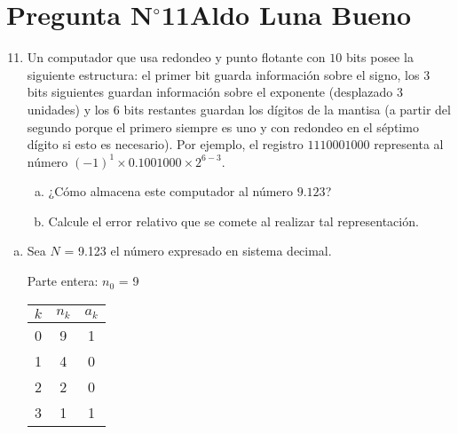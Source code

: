 \section{Pregunta N$^{\circ}$11\qquad Aldo Luna Bueno}

\begin{frame}
	\begin{enumerate}\setcounter{enumi}{10}
		\item

		      Un computador que usa redondeo y punto flotante con $10$
		      bits posee la siguiente estructura:
		      el primer bit guarda información sobre el signo, los 3 bits
		      siguientes guardan información sobre el exponente
		      (desplazado $3$ unidades) y los $6$ bits restantes guardan
		      los dígitos de la mantisa (a partir del segundo porque el
		      primero siempre es uno y con redondeo en el séptimo dígito
		      si esto es necesario).
		      Por ejemplo, el registro $1110001000$ representa al número
		      ${\left(-1\right)}^{1}\times 0.1001000\times 2^{6-3}$.

		      \begin{enumerate}[a)]
			      \item

			            ¿Cómo almacena este computador al número $9.123$?

			      \item

			            Calcule el error relativo que se comete al realizar
			            tal representación.
		      \end{enumerate}
	\end{enumerate}

	\begin{solution}            
		\begin{enumerate}[a)]
			\item
			      Sea $N$ = 9.123 el número expresado en sistema decimal.

			      Parte entera: $n_{0}$ = 9
         
			      \begin{tabular}{c|c|c}
				      $k$ & $n_{k}$ & $a_{k}$ \\ \hline
				      0   & 9       & 1       \\ 
				      1   & 4       & 0       \\ 
				      2   & 2       & 0       \\ 
				      3   & 1       & 1
			      \end{tabular}
         

\end{enumerate}
\end{solution}
\end{frame}
